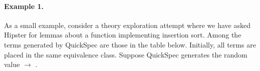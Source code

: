 
\paragraph*{Example 1.}
\label{example1}

As a small example, consider a theory exploration attempt where we have asked Hipster for lemmas about a function  implementing insertion sort.
%
%
Among the terms generated by QuickSpec are those in the table below.
%
Initially, all terms are placed in the same equivalence class.
%
Suppose QuickSpec generates the random value  $\rightarrow$ \isaCode{[3,1]}.     


